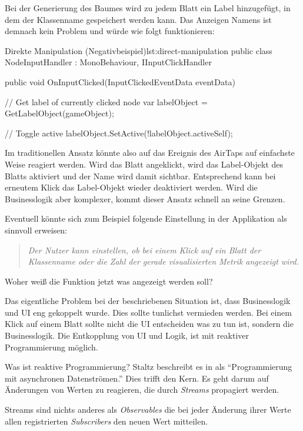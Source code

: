 Bei der Generierung des Baumes wird zu jedem Blatt ein Label hinzugefügt, in dem der Klassenname gespeichert werden kann. Das Anzeigen Namens ist demnach kein Problem und würde wie folgt funktionieren:

\begin{codesnippet}{Direkte Manipulation (Negativbeispiel)}{lst:direct-manipulation}
public class NodeInputHandler : MonoBehaviour, IInputClickHandler
{
    public void OnInputClicked(InputClickedEventData eventData)
    {
        // Get label of currently clicked node
        var labelObject = GetLabelObject(gameObject);
        
        // Toggle active
        labelObject.SetActive(!labelObject.activeSelf);
    }
}
\end{codesnippet}

Im traditionellen Ansatz könnte also auf das Ereignis des AirTaps auf einfachste Weise reagiert werden. Wird das Blatt angeklickt, wird das Label-Objekt des Blatts aktiviert und der Name wird damit sichtbar. Entsprechend kann bei erneutem Klick das Label-Objekt wieder deaktiviert werden. Wird die Businesslogik aber komplexer, kommt dieser Ansatz schnell an seine Grenzen.

Eventuell könnte sich zum Beispiel folgende Einstellung in der Applikation als sinnvoll erweisen:

\begin{quotation}
  \textit{Der Nutzer kann einstellen, ob bei einem Klick auf ein Blatt der Klassenname oder die Zahl der gerade visualisierten Metrik angezeigt wird.}
\end{quotation}

Woher weiß die Funktion jetzt was angezeigt werden soll?

Das eigentliche Problem bei der beschriebenen Situation ist, dass Businesslogik und UI eng gekoppelt wurde. Dies sollte tunlichst vermieden werden. Bei einem Klick auf einem Blatt sollte nicht die UI entscheiden was zu tun ist, sondern die Businesslogik. Die Entkopplung von UI und Logik, ist mit reaktiver Programmierung möglich.

Was ist reaktive Programmierung? Staltz beschreibt es in \cite{staltz2016introduction} als "`Programmierung mit asynchronen Datenströmen."' Dies trifft den Kern. Es geht darum auf Änderungen von Werten zu reagieren, die durch \textit{Streams} propagiert werden.

Streams sind nichts anderes als \textit{Observables} die bei jeder Änderung ihrer Werte allen registrierten \textit{Subscribers} den neuen Wert mitteilen.

